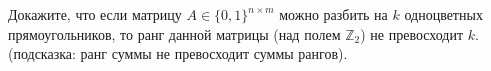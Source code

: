 Докажите, что если матрицу $A \in \{0, 1\}^{n \times m}$ можно разбить на $k$ одноцветных прямоугольников, то ранг данной
матрицы (над полем $\mathbb{Z}_2$) не превосходит $k$. (подсказка: ранг суммы не превосходит суммы рангов).